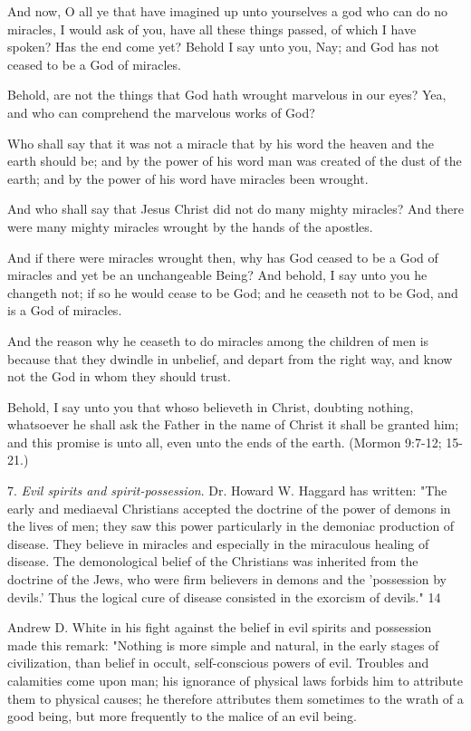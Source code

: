 And now, O all ye that have imagined up unto yourselves a god who can do no miracles, I
would ask of you, have all these things passed, of which I have spoken? Has the end come
yet? Behold I say unto you, Nay; and God has not ceased to be a God of miracles.

Behold, are not the things that God hath wrought marvelous in our eyes? Yea, and who can
comprehend the marvelous works of God?

Who shall say that it was not a miracle that by his word the heaven and the earth should be;
and by the power of his word man was created of the dust of the earth; and by the power of
his word have miracles been wrought.

And who shall say that Jesus Christ did not do many mighty miracles? And there were many
mighty miracles wrought by the hands of the apostles.

And if there were miracles wrought then, why has God ceased to be a God of miracles and
yet be an unchangeable Being? And behold, I say unto you he changeth not; if so he would
cease to be God; and he ceaseth not to be God, and is a God of miracles.

And the reason why he ceaseth to do miracles among the children of men is because that they
dwindle in unbelief, and depart from the right way, and know not the God in whom they
should trust.

Behold, I say unto you that whoso believeth in Christ, doubting nothing, whatsoever he shall
ask the Father in the name of Christ it shall be granted him; and this promise is unto all, even
unto the ends of the earth. (Mormon 9:7-12; 15-21.)

7. \textit{Evil spirits and spirit-possession}. Dr. Howard W. Haggard has written: "The early and
mediaeval Christians accepted the doctrine of the power of demons in the lives of men; they
saw this power particularly in the demoniac production of disease. They believe in miracles
and especially in the miraculous healing of disease. The demonological belief of the
Christians was inherited from the doctrine of the Jews, who were firm believers in demons
and the 'possession by devils.' Thus the logical cure of disease consisted in the exorcism of
devils." 14

Andrew D. White in his fight against the belief in evil spirits and possession made this
remark: "Nothing is more simple and natural, in the early stages of civilization, than belief in
occult, self-conscious powers of evil. Troubles and calamities come upon man; his ignorance
of physical laws forbids him to attribute them to physical causes; he therefore attributes them
sometimes to the wrath of a good being, but more frequently to the malice of an evil being.

